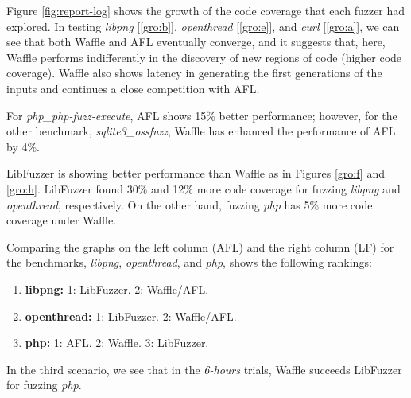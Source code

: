 Figure \ref{fig:report-log} shows the growth of the code coverage that each fuzzer had explored. In testing \textit{libpng} [\ref{gro:b}], \textit{openthread} [\ref{gro:e}], and \textit{curl} [\ref{gro:a}], we can see that both Waffle and AFL eventually converge, and it suggests that, here, Waffle performs indifferently in the discovery of new regions of code (higher code coverage). Waffle also shows latency in generating the first generations of the inputs and continues a close competition with AFL.

For \textit{php\_php-fuzz-execute}, AFL shows 15\% better performance; however, for the other benchmark, \textit{sqlite3\_ossfuzz}, Waffle has enhanced the performance of AFL by 4\%.

LibFuzzer is showing better performance than Waffle as in Figures \ref{gro:f} and \ref{gro:h}. LibFuzzer found 30\% and 12\% more code coverage for fuzzing \textit{libpng} and \textit{openthread}, respectively. On the other hand, fuzzing \textit{php} has 5\% more code coverage under Waffle.

Comparing the graphs on the left column (AFL) and the right column (LF) for the benchmarks, \textit{libpng}, \textit{openthread}, and \textit{php}, shows the following rankings:

\begin{enumerate}
    \item \textbf{libpng:} 1: LibFuzzer. 2: Waffle/AFL.
    \item \textbf{openthread:} 1: LibFuzzer. 2: Waffle/AFL.
    \item \textbf{php:} 1: AFL. 2: Waffle. 3: LibFuzzer.
\end{enumerate}

In the third scenario, we see that in the \textit{6-hours} trials, Waffle succeeds LibFuzzer for fuzzing \textit{php}.

